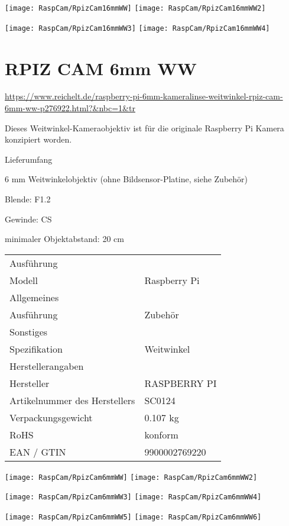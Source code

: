 \texttt{[image: RaspCam/RpizCam16mmWW]} \quad \texttt{[image: RaspCam/RpizCam16mmWW2]}

\texttt{[image: RaspCam/RpizCam16mmWW3]} \quad \texttt{[image: RaspCam/RpizCam16mmWW4]}


\chapter{RPIZ CAM 6mm WW}

\url{https://www.reichelt.de/raspberry-pi-6mm-kameralinse-weitwinkel-rpiz-cam-6mm-ww-p276922.html?&nbc=1&tr}


Dieses Weitwinkel-Kameraobjektiv ist für die originale Raspberry Pi Kamera konzipiert worden.

Lieferumfang

6 mm Weitwinkelobjektiv (ohne Bildsensor-Platine, siehe Zubehör)


Blende: F1.2

Gewinde: CS

minimaler Objektabstand: 20 cm



\begin{tabular}{ll}
Ausführung & \\
Modell &  Raspberry Pi \\
Allgemeines & \\
Ausführung &   Zubehör \\
Sonstiges & \\
Spezifikation  & Weitwinkel \\
Herstellerangaben & \\
Hersteller &   RASPBERRY PI \\
Artikelnummer des Herstellers  & SC0124 \\
Verpackungsgewicht &  0.107 kg \\
RoHS &  konform \\
EAN / GTIN &  9900002769220 \\
\end{tabular}

\texttt{[image: RaspCam/RpizCam6mmWW]} \quad \texttt{[image: RaspCam/RpizCam6mmWW2]}

\texttt{[image: RaspCam/RpizCam6mmWW3]} \quad \texttt{[image: RaspCam/RpizCam6mmWW4]}

\texttt{[image: RaspCam/RpizCam6mmWW5]} \quad \texttt{[image: RaspCam/RpizCam6mmWW6]}
